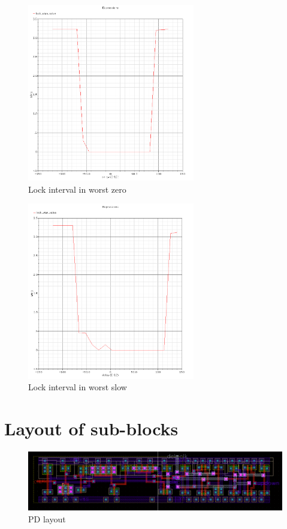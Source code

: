 \documentclass[a4paper,12pt]{article} \usepackage{graphicx}
\begin{document}
\begin{figure}[h]
  \centering
  \includegraphics[width=0.65\textwidth]{../Bilder/LD_tran/LD_lsim_wz.png}
  \caption{Lock interval in worst zero}
  \label{fig:LDwz}
\end{figure}

\begin{figure}[h]
  \centering
  \includegraphics[width=0.65\textwidth]{../Bilder/LD_tran/LD_lsim_ws.png}
  \caption{Lock interval in worst slow}
  \label{fig:LDws}
\end{figure}

\section{Layout of sub-blocks}
\label{sec:Layout}

\begin{figure}[h]
  \centering
  \includegraphics[width=1.0\textwidth]{../Bilder/Layout/pd_including_clk_set.png}
  \caption{PD layout}
  \label{fig:pd_final}
\end{figure}
\end{document}
